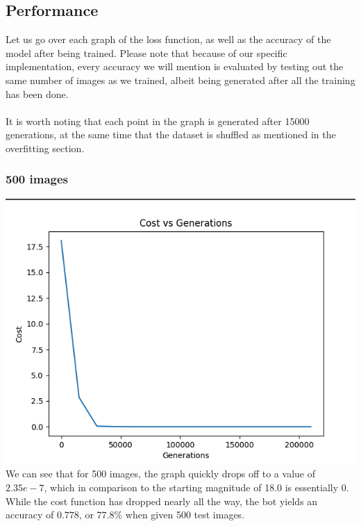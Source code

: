 \documentclass[12pt]{article}
\begin{document}
\subsection*{Performance}
Let us go over each graph of the loss function, as well as the accuracy of the model after being trained. Please 
note that because of our specific implementation, every accuracy we will mention is evaluated by testing out 
the same number of images as we trained, albeit being generated after all the training has been done. 
\\
\\
It is worth noting that each point in the graph is generated after 15000 generations, at the same time that 
the dataset is shuffled as mentioned in the overfitting section.

\subsubsection*{500 images}
\includegraphics*[scale=0.5]{500task2} \\
We can see that for 500 images, the graph quickly drops off to a value of $2.35e-7$, which in comparison to 
the starting magnitude of 18.0 is essentially 0. While the cost function has dropped nearly all the way, the bot 
yields an accuracy of $0.778$, or $77.8 \%$ when given 500 test images.    
\end{document}
